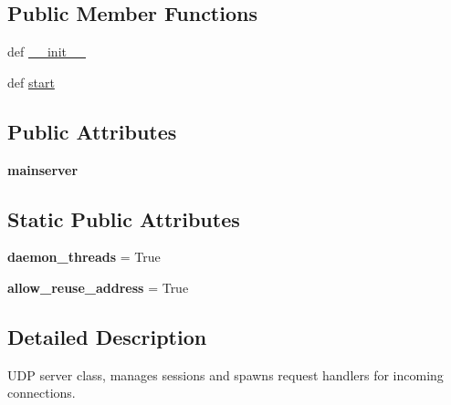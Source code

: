 \subsection*{Public Member Functions}
\begin{DoxyCompactItemize}
\item 
def \hyperlink{classcore_1_1coreserver_1_1_core_udp_server_af8307d8aae116771a24cc48a8ee1a880}{\+\_\+\+\_\+init\+\_\+\+\_\+}
\item 
def \hyperlink{classcore_1_1coreserver_1_1_core_udp_server_a82b33cecdcfabdc2ff84a2d8a43f6123}{start}
\end{DoxyCompactItemize}
\subsection*{Public Attributes}
\begin{DoxyCompactItemize}
\item 
\hypertarget{classcore_1_1coreserver_1_1_core_udp_server_a1d9e7bfac4a1610774a5ac9dd9e84ffa}{{\bfseries mainserver}}\label{classcore_1_1coreserver_1_1_core_udp_server_a1d9e7bfac4a1610774a5ac9dd9e84ffa}

\end{DoxyCompactItemize}
\subsection*{Static Public Attributes}
\begin{DoxyCompactItemize}
\item 
\hypertarget{classcore_1_1coreserver_1_1_core_udp_server_af924d00153a903d0d226a85645582061}{{\bfseries daemon\+\_\+threads} = True}\label{classcore_1_1coreserver_1_1_core_udp_server_af924d00153a903d0d226a85645582061}

\item 
\hypertarget{classcore_1_1coreserver_1_1_core_udp_server_a2a818ee1379dea1e5478bed5cc13906e}{{\bfseries allow\+\_\+reuse\+\_\+address} = True}\label{classcore_1_1coreserver_1_1_core_udp_server_a2a818ee1379dea1e5478bed5cc13906e}

\end{DoxyCompactItemize}


\subsection{Detailed Description}
\begin{DoxyVerb}UDP server class, manages sessions and spawns request handlers for
    incoming connections.
\end{DoxyVerb}
 

